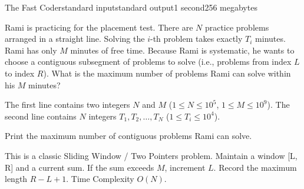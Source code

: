 \begin{problem}{The Fast Coder}{standard input}{standard output}{1 second}{256 megabytes}

Rami is practicing for the placement test. There are $N$ practice problems arranged in a straight line. Solving the $i$-th problem takes exactly $T_i$ minutes. Rami has only $M$ minutes of free time.
Because Rami is systematic, he wants to choose a contiguous subsegment of problems to solve (i.e., problems from index $L$ to index $R$). What is the maximum number of problems Rami can solve within his $M$ minutes?

\InputFile
The first line contains two integers $N$ and $M$ ($1 \le N \le 10^5$, $1 \le M \le 10^9$).
The second line contains $N$ integers $T_1, T_2, \dots, T_N$ ($1 \le T_i \le 10^4$).

\OutputFile
Print the maximum number of contiguous problems Rami can solve.

\Example

\begin{example}
%
\end{example}

\Note
This is a classic Sliding Window / Two Pointers problem. Maintain a window [L, R] and a current sum. If the sum exceeds $M$, increment $L$. Record the maximum length $R - L + 1$. Time Complexity $O(N)$.

\end{problem}

